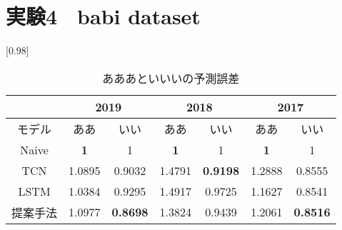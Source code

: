 \section{実験4　babi dataset}

\begin{comment}
	また，ああああああ
\end{comment}

\begin{table}[H]
	\caption{あああといいいの予測誤差}
	\centering
	\scalebox{0.98}[0.98]{
		\begin{tabular}{c|c|c|c|c|c|c}
			\multicolumn{1}{c}{} & \multicolumn{2}{|c|}{2019} 
			& \multicolumn{2}{c|}{2018} & \multicolumn{2}{c}{2017}\\ \hline \hline
			モデル    & ああ & いい & ああ & いい & ああ & いい \\ \hline
			Naive    & \bf{1} & 1 & \bf{1} & 1 & \bf{1} & 1 \\
			TCN      & 1.0895 & 0.9032 & 1.4791 & \bf{0.9198} & 1.2888 & 0.8555 \\
			LSTM     & 1.0384 & 0.9295 & 1.4917 & 0.9725 & 1.1627 & 0.8541 \\
			提案手法  & 1.0977 & \bf{0.8698} & 1.3824 & 0.9439 & 1.2061 & \bf{0.8516} \\
		\end{tabular}
	}
	\label{table:result-1}
\end{table}
